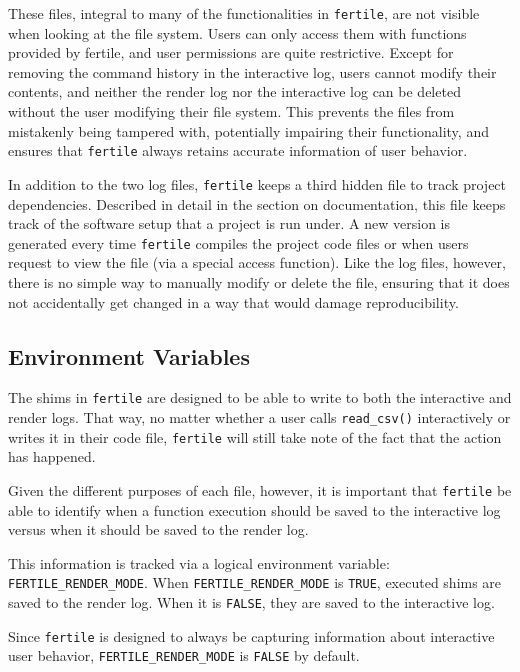 \documentclass[12pt,twoside]{reedthesis}
\begin{document}
These files, integral to many of the functionalities in \texttt{fertile}, are not visible when looking at the file system. Users can only access them with functions provided by fertile, and user permissions are quite restrictive. Except for removing the command history in the interactive log, users cannot modify their contents, and neither the render log nor the interactive log can be deleted without the user modifying their file system. This prevents the files from mistakenly being tampered with, potentially impairing their functionality, and ensures that \texttt{fertile} always retains accurate information of user behavior.

In addition to the two log files, \texttt{fertile} keeps a third hidden file to track project dependencies. Described in detail in the section on documentation, this file keeps track of the software setup that a project is run under. A new version is generated every time \texttt{fertile} compiles the project code files or when users request to view the file (via a special access function). Like the log files, however, there is no simple way to manually modify or delete the file, ensuring that it does not accidentally get changed in a way that would damage reproducibility.

\hypertarget{environment-variables}{%
\subsection{Environment Variables}\label{environment-variables}}

The shims in \texttt{fertile} are designed to be able to write to both the interactive and render logs. That way, no matter whether a user calls \texttt{read\_csv()} interactively or writes it in their code file, \texttt{fertile} will still take note of the fact that the action has happened.

Given the different purposes of each file, however, it is important that \texttt{fertile} be able to identify when a function execution should be saved to the interactive log versus when it should be saved to the render log.

This information is tracked via a logical environment variable: \texttt{FERTILE\_RENDER\_MODE}. When \texttt{FERTILE\_RENDER\_MODE} is \texttt{TRUE}, executed shims are saved to the render log. When it is \texttt{FALSE}, they are saved to the interactive log.

Since \texttt{fertile} is designed to always be capturing information about interactive user behavior, \texttt{FERTILE\_RENDER\_MODE} is \texttt{FALSE} by default.
\end{document}
